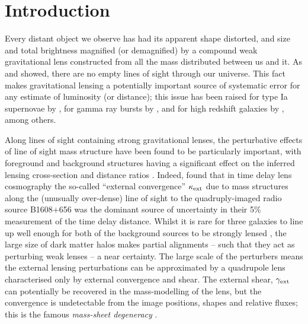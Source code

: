 \documentclass[useAMS,usenatbib]{mn2e}
\begin{document}
\setcounter{footnote}{1}


\section{Introduction}
\label{sec:intro}

Every distant object we observe has had its apparent shape distorted,
and size and total brightness magnified (or demagnified) by a compound
weak gravitational lens constructed from all the mass distributed
between us and it. As \citet{Vale+White2003} and \citet{HilbertEtal2007}
showed, there are no empty lines of sight through our universe. This
fact makes gravitational lensing a potentially important source of
systematic error for any estimate of luminosity (or distance); this 
issue has been 
raised for \eg type Ia supernovae by
\citet[][]{Holz+Wald1998,Holz+Linder2005}, for gamma ray bursts by
\citet[][]{Oguri+Takahashi2006,Wang+Dai2011},  and for high redshift
galaxies by \citet{BradacEtal2009}, among others. 

Along lines of sight containing strong gravitational lenses, the
perturbative effects of line of sight mass structure have been found to
be particularly important, with foreground and background structures
having a significant effect on the inferred lensing cross-section
\citep[\eg][]{WongEtal2012} and distance ratios
\citep[][]{DalalEtal2005}. Indeed, \citet{SuyuEtal2010} found that in
time delay lens cosmography the so-called ``external convergence''
$\kappa_{\rm ext}$ due to mass structures along the (unusually over-dense) line
of sight to the quadruply-imaged radio source B1608$+$656 was the
dominant source of uncertainty in their 5\% measurement of the time delay distance. 
Whilst it is rare for three galaxies to line up well enough for both of
the background sources to be strongly lensed \citep{GavazziEtal2008,CollettEtal2012a}, 
the large size of dark matter halos makes partial alignments -- such that they
act as perturbing weak lenses --  a near certainty. The large scale of the
perturbers means the external lensing perturbations can be approximated
by a quadrupole lens characterised only by external convergence and shear.
The external shear, $\gamma_{\rm ext}$ can potentially be recovered in the
mass-modelling of the lens, but the convergence is undetectable from the
image positions, shapes and relative fluxes; this is the famous {\emph{ 
mass-sheet degeneracy}} \citep[see e.g.][for details]{FalcoEtal1985}.
\end{document}
